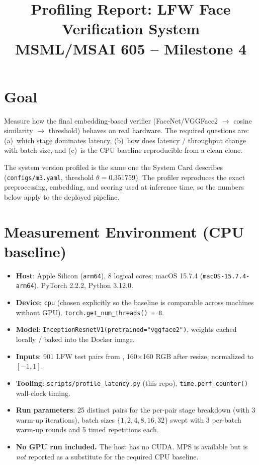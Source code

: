 \documentclass[11pt]{article}
\title{\textbf{Profiling Report: LFW Face Verification System}\\
\large MSML/MSAI 605 -- Milestone 4}
\author{}
\date{}
\newcommand{\fpath}[1]{\path{#1}}
\begin{document}
\maketitle
\vspace{-2em}

\section{Goal}
Measure how the final embedding-based verifier (FaceNet/VGGFace2 $\to$ cosine
similarity $\to$ threshold) behaves on real hardware. The required questions are:
(a)~which stage dominates latency, (b)~how does latency / throughput change with
batch size, and (c)~is the CPU baseline reproducible from a clean clone.

The system version profiled is the same one the System Card describes
(\texttt{configs/m3.yaml}, threshold $\theta=0.351759$). The profiler reproduces the
exact preprocessing, embedding, and scoring used at inference time, so the numbers
below apply to the deployed pipeline.

\section{Measurement Environment (CPU baseline)}
\begin{itemize}[noitemsep, leftmargin=*]
    \item \textbf{Host}: Apple Silicon (\texttt{arm64}), 8 logical cores; macOS 15.7.4
    (\texttt{macOS-15.7.4-arm64}). PyTorch 2.2.2, Python 3.12.0.
    \item \textbf{Device}: \texttt{cpu} (chosen explicitly so the baseline is comparable
    across machines without GPU). \texttt{torch.get\_num\_threads() = 8}.
    \item \textbf{Model}: \texttt{InceptionResnetV1(pretrained="vggface2")}, weights
    cached locally / baked into the Docker image.
    \item \textbf{Inputs}: 901 LFW test pairs from \fpath{outputs/pairs/test.csv},
    160$\times$160 RGB after resize, normalized to $[-1, 1]$.
    \item \textbf{Tooling}: \texttt{scripts/profile\_latency.py} (this repo),
    \texttt{time.perf\_counter()} wall-clock timing.
    \item \textbf{Run parameters}: 25 distinct pairs for the per-pair stage
    breakdown (with 3 warm-up iterations), batch sizes $\{1,2,4,8,16,32\}$ swept with
    3 per-batch warm-up rounds and 5 timed repetitions each.
    \item \textbf{No GPU run included.} The host has no CUDA. MPS is available but is
    \emph{not} reported as a substitute for the required CPU baseline.
\end{itemize}
\end{document}
